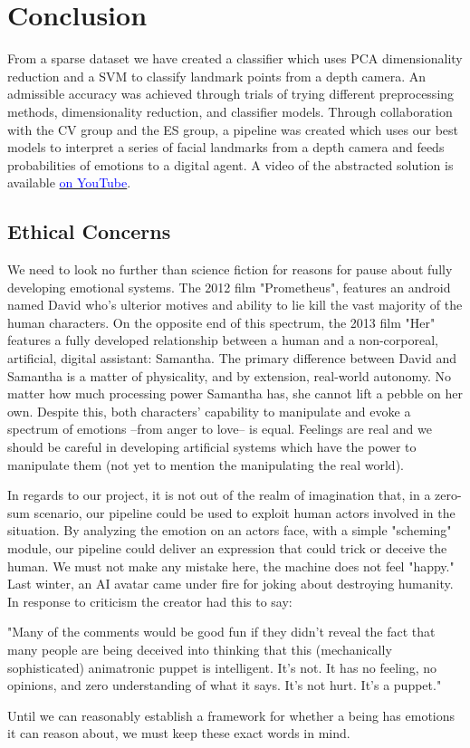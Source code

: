\section{Conclusion}

From a sparse dataset we have created a classifier which uses PCA dimensionality reduction and a SVM to classify landmark points from a depth camera. An admissible accuracy was achieved through trials of trying different preprocessing methods, dimensionality reduction, and classifier models. Through collaboration with the CV group and the ES group, a pipeline was created which uses our best models to interpret a series of facial landmarks from a depth camera and feeds probabilities of emotions to a digital agent. A video of the abstracted solution is available \href{https://youtu.be/Owlukfpjqqk}{\textcolor{blue}{on YouTube}}.

\subsection{Ethical Concerns}
We need to look no further than science fiction for reasons for pause about fully developing emotional systems. The 2012 film "Prometheus", features an android named David who's ulterior motives and ability to lie kill the vast majority of the human characters. On the opposite end of this spectrum, the 2013 film "Her" features a fully developed relationship between a human and a non-corporeal, artificial, digital assistant: Samantha. The primary difference between David and Samantha is a matter of physicality, and by extension, real-world autonomy. No matter how much processing power Samantha has, she cannot lift a pebble on her own. Despite this, both characters' capability to manipulate and evoke a spectrum of emotions --from anger to love-- is equal. Feelings are real and we should be careful in developing artificial systems which have the power to manipulate them (not yet to mention the manipulating the real world).

In regards to our project, it is not out of the realm of imagination that, in a zero-sum scenario, our pipeline could be used to exploit human actors involved in the situation. By analyzing the emotion on an actors face, with a simple "scheming" module, our pipeline could deliver an expression that could trick or deceive the human. We must not make any mistake here, the machine does not feel "happy." Last winter, an AI avatar came under fire for joking about destroying humanity. In response to criticism the creator had this to say:

"Many of the comments would be good fun if they didn’t reveal the fact that many people are being deceived into thinking that this (mechanically sophisticated) animatronic puppet is intelligent. It’s not. It has no feeling, no opinions, and zero understanding of what it says. It’s not hurt. It’s a puppet." \cite{sofia}

Until we can reasonably establish a framework for whether a being has emotions it can reason about, we must keep these exact words in mind.